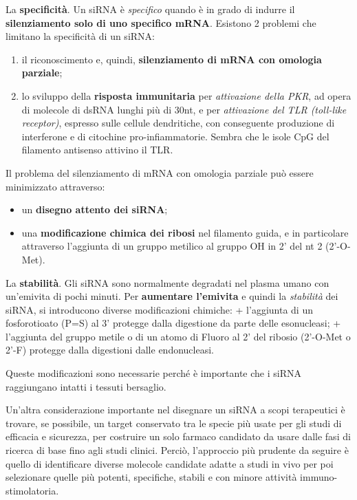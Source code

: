 \documentclass[]{article}
\begin{document}
La \textbf{specificità}. Un siRNA è \emph{specifico} quando è in grado
di indurre il \textbf{silenziamento solo di uno specifico mRNA}.
Esistono 2 problemi che limitano la specificità di un siRNA:

\begin{enumerate}
\def\labelenumi{\arabic{enumi}.}
\itemsep1pt\parskip0pt
\item
  il riconoscimento e, quindi, \textbf{silenziamento di mRNA con
  omologia parziale};
\item
  lo sviluppo della \textbf{risposta immunitaria} per \emph{attivazione
  della PKR}, ad opera di molecole di dsRNA lunghi più di 30nt, e per
  \emph{attivazione del TLR (toll-like receptor)}, espresso sulle
  cellule dendritiche, con conseguente produzione di interferone e di
  citochine pro-infiammatorie. Sembra che le isole CpG del filamento
  antisenso attivino il TLR.
\end{enumerate}

Il problema del silenziamento di mRNA con omologia parziale può essere
minimizzato attraverso:

\begin{itemize}
\itemsep1pt\parskip0pt
\item
  un \textbf{disegno attento dei siRNA};
\item
  una \textbf{modificazione chimica dei ribosi} nel filamento guida, e
  in particolare attraverso l'aggiunta di un gruppo metilico al gruppo
  OH in 2' del nt 2 (2'-O-Met).
\end{itemize}

La \textbf{stabilità}. Gli siRNA sono normalmente degradati nel plasma
umano con un'emivita di pochi minuti. Per \textbf{aumentare l'emivita} e
quindi la \emph{stabilità} dei siRNA, si introducono diverse
modificazioni chimiche: + l'aggiunta di un fosforotioato (P=S) al 3'
protegge dalla digestione da parte delle esonucleasi; + l'aggiunta del
gruppo metile o di un atomo di Fluoro al 2' del ribosio (2'-O-Met o
2'-F) protegge dalla digestioni dalle endonucleasi.

Queste modificazioni sono necessarie perché è importante che i siRNA
raggiungano intatti i tessuti bersaglio.

Un'altra considerazione importante nel disegnare un siRNA a scopi
terapeutici è trovare, se possibile, un target conservato tra le specie
più usate per gli studi di efficacia e sicurezza, per costruire un solo
farmaco candidato da usare dalle fasi di ricerca di base fino agli studi
clinici. Perciò, l'approccio più prudente da seguire è quello di
identificare diverse molecole candidate adatte a studi in vivo per poi
selezionare quelle più potenti, specifiche, stabili e con minore
attività immuno-stimolatoria.
\end{document}
